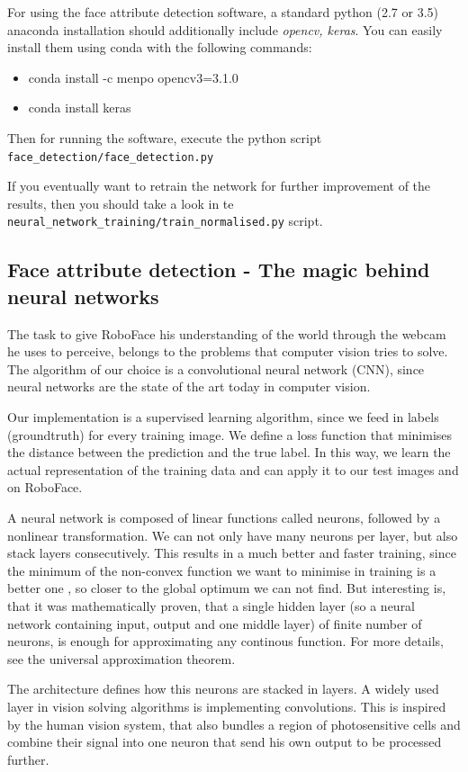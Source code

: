 \documentclass[12.5pt]{scrartcl}
\begin{document}
	
	For using the face attribute detection software, a standard python (2.7 or 3.5) anaconda installation should additionally include \textit{opencv, keras}. You can easily install them using conda with the following commands:
	\begin{itemize}
	\item conda install -c menpo opencv3=3.1.0
	\item conda install keras
	\end{itemize}
	Then for running the software, execute the python script \texttt{face\_detection/face\_detection.py}
	
	If you eventually want to retrain the network for further improvement of the results, then you should take a look in te \texttt{neural\_network\_training/train\_normalised.py} script.
	\subsection{Face attribute detection - The magic behind neural networks}
	The task to give RoboFace his understanding of the world through the webcam he uses to perceive, belongs to the problems that computer vision tries to solve. The algorithm of our choice is a convolutional neural network (CNN), since neural networks are the state of the art today in computer vision.
	
	Our implementation is a supervised learning algorithm, since we feed in labels (groundtruth) for every training image. We define a loss function that minimises the distance between the prediction and the true label. In this way, we learn the actual representation of the training data and can apply it to our test images and on RoboFace.
	
	A neural network is composed of linear functions called neurons, followed by a nonlinear transformation. We can not only have many neurons per layer, but also stack layers consecutively. This results in a much better and faster training, since the minimum of the non-convex function we want to minimise in training is a better one , so closer to the global optimum we can not find. But interesting is, that it was mathematically proven, that a single hidden layer (so a neural network containing input, output and one middle layer) of finite number of neurons, is enough for approximating any continous function. For more details, see the universal approximation theorem.
	
	
	The architecture defines how this neurons are stacked in layers. A widely used layer in vision solving algorithms is implementing convolutions. This is inspired by the human vision system, that also bundles a region of photosensitive cells and combine their signal into one neuron that send his own output to be processed further.
	
\end{document}
